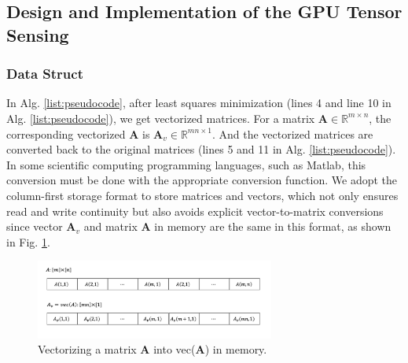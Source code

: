 \documentclass[futureinternet,article,submit,moreauthors,pdftex,10pt,a4paper]{Definitions/mdpi}
\theoremstyle{plain}
\theoremstyle{definition}
\theoremstyle{remark}
\begin{document}
\subsection{Design and Implementation of the GPU Tensor Sensing}
\subsubsection{Data Struct}
In Alg. \ref{list:pseudocode}, after least squares minimization (lines 4 and line 10 in Alg. \ref{list:pseudocode}), we get vectorized matrices. For a matrix $\mathbf{A} \in \mathbb{R}^{m \times n}$, the corresponding vectorized $\mathbf{A}$ is $\mathbf{A}_v \in \mathbb{R}^{mn \times 1}$. And the vectorized matrices are converted back to the original matrices (lines 5 and 11 in Alg. \ref{list:pseudocode}). In some scientific computing programming languages, such as Matlab, this conversion must be done with the appropriate conversion function.
We adopt the column-first storage format to store matrices and vectors, which not only ensures read and write continuity but also avoids explicit vector-to-matrix conversions since vector $\mathbf{A}_v$ and matrix $\mathbf{A}$ in memory are the same in this format, as shown in Fig. \ref{Fig:vec2mat}.

\begin{figure}[H]
\centering
\includegraphics[width=0.7\textwidth]{vec2mat.png}
\caption{Vectorizing a matrix $\mathbf{A}$ into vec($\mathbf{A}$) in memory.}
\label{Fig:vec2mat}
\end{figure}
\end{document}
